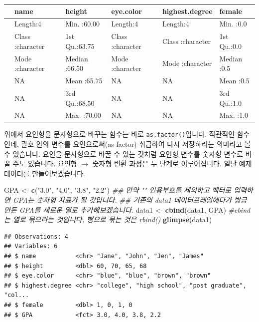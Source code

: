\documentclass[]{book}
\newenvironment{Shaded}{\begin{snugshade}}{\end{snugshade}}
\newcommand{\CommentTok}[1]{\textcolor[rgb]{0.56,0.35,0.01}{\textit{#1}}}
\newcommand{\KeywordTok}[1]{\textcolor[rgb]{0.13,0.29,0.53}{\textbf{#1}}}
\newcommand{\NormalTok}[1]{#1}
\newcommand{\StringTok}[1]{\textcolor[rgb]{0.31,0.60,0.02}{#1}}
\begin{document}
\begin{tabular}{l|l|l|l|l|l}
\hline
  &     name &     height &  eye.color & highest.degree &     female\\
\hline
 & Length:4 & Min.   :60.00 & Length:4 & Length:4 & Min.   :0.0\\
\hline
 & Class :character & 1st Qu.:63.75 & Class :character & Class :character & 1st Qu.:0.0\\
\hline
 & Mode  :character & Median :66.50 & Mode  :character & Mode  :character & Median :0.5\\
\hline
 & NA & Mean   :65.75 & NA & NA & Mean   :0.5\\
\hline
 & NA & 3rd Qu.:68.50 & NA & NA & 3rd Qu.:1.0\\
\hline
 & NA & Max.   :70.00 & NA & NA & Max.   :1.0\\
\hline
\end{tabular}

위에서 요인형을 문자형으로 바꾸는 함수는 바로 \texttt{as.factor()}입니다. 직관적인 함수인데, 괄호 안의 변수를 요인으로써(as factor) 취급하여 다시 저장하라는 의미라고 볼 수 있습니다. 요인을 문자형으로 바꿀 수 있는 것처럼 요인형 변수를 숫자형 변수로 바꿀 수도 있습니다. 요인형 \(\rightarrow\) 숫자형 변환 과정은 두 단계로 이루어집니다. 일단 예제 데이터를 만들어보겠습니다.

\begin{Shaded}
\begin{Highlighting}[]
\NormalTok{GPA <-}\StringTok{ }\KeywordTok{c}\NormalTok{(}\StringTok{"3.0"}\NormalTok{, }\StringTok{"4.0"}\NormalTok{, }\StringTok{"3.8"}\NormalTok{, }\StringTok{"2.2"}\NormalTok{)}
\CommentTok{## 만약 "" 인용부호를 제외하고 벡터로 입력하면 GPA는 숫자형 자료가 될 것입니다.}
\CommentTok{## 기존의 data1 데이터프레임에다가 방금 만든 GPA를 새로운 열로 추가해보겠습니다.}
\NormalTok{data1 <-}\StringTok{ }\KeywordTok{cbind}\NormalTok{(data1, GPA) }\CommentTok{#cbind는 열로 묶으라는 것입니다, 행으로 묶는 것은 rbind()}
\KeywordTok{glimpse}\NormalTok{(data1)}
\end{Highlighting}
\end{Shaded}

\begin{verbatim}
## Observations: 4
## Variables: 6
## $ name           <chr> "Jane", "John", "Jen", "James"
## $ height         <dbl> 60, 70, 65, 68
## $ eye.color      <chr> "blue", "blue", "brown", "brown"
## $ highest.degree <chr> "college", "high school", "post graduate", "col...
## $ female         <dbl> 1, 0, 1, 0
## $ GPA            <fct> 3.0, 4.0, 3.8, 2.2
\end{verbatim}
\end{document}

